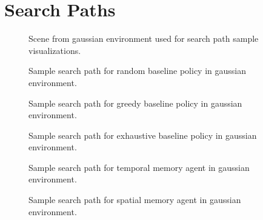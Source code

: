 \chapter{Search Paths}
\label{app:paths}

\begin{figure}
    \centering
    
    \caption[Scene for search paths]{Scene from gaussian environment used for search path sample visualizations.}
    \label{fig:path-scene}
\end{figure}    

\begin{figure}
    \centering
    
    \caption[Random baseline search path]{Sample search path for random baseline policy in gaussian environment.}
    \label{fig:path-random}
\end{figure}

\begin{figure}
    \centering
    
    \caption[Random baseline search path]{Sample search path for greedy baseline policy in gaussian environment.}
    \label{fig:path-greedy}
\end{figure}

\begin{figure}
    \centering
    
    \caption[Random baseline search path]{Sample search path for exhaustive baseline policy in gaussian environment.}
    \label{fig:path-exhaustive}
\end{figure}

\begin{figure}
    \centering
    
    \caption[Temporal memory agent search path]{Sample search path for temporal memory agent in gaussian environment.}
    \label{fig:path-lstm}
\end{figure}

\begin{figure}
    \centering
    
    \caption[Spatial memory agent search path]{Sample search path for spatial memory agent in gaussian environment.}
    \label{fig:path-map}
\end{figure}